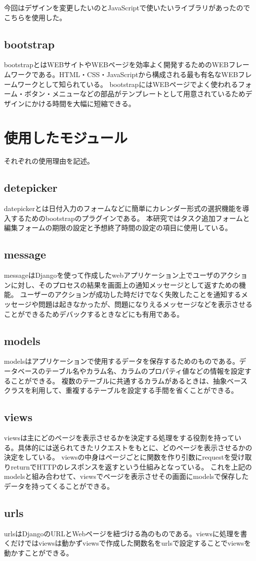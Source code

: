 今回はデザインを変更したいのとJavaScriptで使いたいライブラリがあったのでこちらを使用した。

\subsection{bootstrap}
bootstrap\cite{bootstrap}とはWEBサイトやWEBページを効率よく開発するためのWEBフレームワークである。HTML・CSS・JavaScriptから構成される最も有名なWEBフレームワークとして知られている。
bootstrapにはWEBページでよく使われるフォーム・ボタン・メニューなどの部品がテンプレートとして用意されているためデザインにかける時間を大幅に短縮できる。
\section{使用したモジュール}
それぞれの使用理由を記述。

\subsection{detepicker}
datepicker\cite{datepicker}とは日付入力のフォームなどに簡単にカレンダー形式の選択機能を導入するためのbootstrapのプラグインである。
本研究ではタスク追加フォームと編集フォームの期限の設定と予想終了時間の設定の項目に使用している。

\subsection{message}
message\cite{message}はDjangoを使って作成したwebアプリケーション上でユーザのアクションに対し、そのプロセスの結果を画面上の通知メッセージとして返すための機能。
ユーザーのアクションが成功した時だけでなく失敗したことを通知するメッセージや問題は起きなかったが、問題になりえるメッセージなどを表示させることができるためデバックするときなどにも有用である。

\subsection{models}
models\cite{models}はアプリケーションで使用するデータを保存するためのものである。データベースのテーブル名やカラム名、カラムのプロパティ値などの情報を設定することができる。
複数のテーブルに共通するカラムがあるときは、抽象ベースクラスを利用して、重複するテーブルを設定する手間を省くことができる。

\subsection{views}
views\cite{views}は主にどのページを表示させるかを決定する処理をする役割を持っている。具体的には送られてきたリクエストをもとに、どのページを表示させるかの決定をしている。
viewsの中身はページごとに関数を作り引数にrequestを受け取りreturnでHTTPのレスポンスを返すという仕組みとなっている。
これを上記のmodelsと組み合わせて、viewsでページを表示させその画面にmodelsで保存したデータを持ってくることができる。

\subsection{urls}
urls\cite{urls}はDjangoのURLとWebページを紐づける為のものである。viewsに処理を書くだけではviewsは動かずviewsで作成した関数名をurlsで設定することでviewsを動かすことができる。
